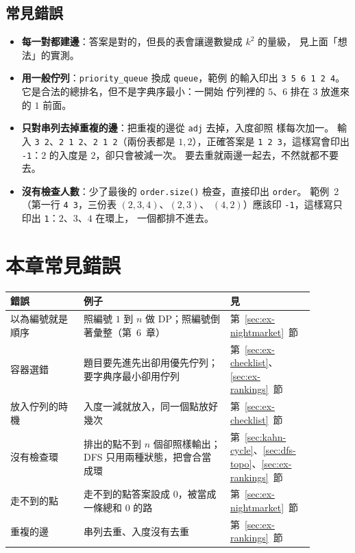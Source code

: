 \subsection{常見錯誤}

\begin{itemize}
\item \textbf{每一對都建邊}：答案是對的，但長的表會讓邊數變成 $k^2$ 的量級，
見上面「想法」的實測。
\item \textbf{用一般佇列}：\texttt{priority\_queue} 換成 \texttt{queue}，範例
的輸入印出 \texttt{3 5 6 1 2 4}。 它是合法的總排名，但不是字典序最小：一開始
佇列裡的 $5$、$6$ 排在 $3$ 放進來的 $1$ 前面。
\item \textbf{只對串列去掉重複的邊}：把重複的邊從 \texttt{adj} 去掉，入度卻照
樣每次加一。 輸入 \texttt{3 2}、\texttt{2 1 2}、\texttt{2 1 2}（兩份表都是
$1, 2$），正確答案是 \texttt{1 2 3}，這樣寫會印出 \texttt{-1}：$2$ 的入度是
$2$，卻只會被減一次。 要去重就兩邊一起去，不然就都不要去。
\item \textbf{沒有檢查人數}：少了最後的 \texttt{order.size()} 檢查，直接印出
\texttt{order}。 範例~2（第一行 \texttt{4 3}，三份表 $(2, 3, 4)$、$(2, 3)$、
$(4, 2)$）應該印 \texttt{-1}，這樣寫只印出 \texttt{1}：$2$、$3$、$4$ 在環上，
一個都排不進去。
\end{itemize}

\section{本章常見錯誤}
\label{sec:dag-pitfalls}

\begin{center}
\begin{tabular}{p{0.22\linewidth}p{0.44\linewidth}p{0.22\linewidth}}
\toprule
錯誤 & 例子 & 見 \\
\midrule
以為編號就是順序 & 照編號 $1$ 到 $n$ 做 DP；照編號倒著彙整（第~6~章） &
第~\ref{sec:ex-nightmarket}~節 \\
容器選錯 & 題目要先進先出卻用優先佇列；要字典序最小卻用佇列 &
第~\ref{sec:ex-checklist}、\ref{sec:ex-rankings}~節 \\
放入佇列的時機 & 入度一減就放入，同一個點放好幾次 &
第~\ref{sec:ex-checklist}~節 \\
沒有檢查環 & 排出的點不到 $n$ 個卻照樣輸出；DFS 只用兩種狀態，把會合當成環 &
第~\ref{sec:kahn-cycle}、\ref{sec:dfs-topo}、\ref{sec:ex-rankings}~節 \\
走不到的點 & 走不到的點答案設成 $0$，被當成一條總和 $0$ 的路 &
第~\ref{sec:ex-nightmarket}~節 \\
重複的邊 & 串列去重、入度沒有去重 & 第~\ref{sec:ex-rankings}~節 \\
\bottomrule
\end{tabular}
\end{center}

